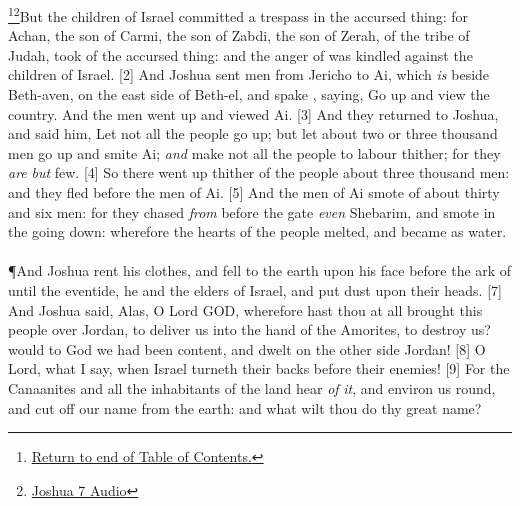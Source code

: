 \footnote{\textcolor[rgb]{0.00,0.25,0.00}{\hyperlink{TOC}{Return to end of Table of Contents.}}}\footnote{\href{https://audiobible.com/bible/joshua_7.html}{\textcolor[cmyk]{0.99998,1,0,0}{Joshua 7 Audio}}}\textcolor[cmyk]{0.99998,1,0,0}{But the children of Israel committed a trespass in the accursed thing: for Achan, the son of Carmi, the son of Zabdi, the son of Zerah, of the tribe of Judah, took of the accursed thing: and the anger of  was kindled against the children of Israel.}
[2] \textcolor[cmyk]{0.99998,1,0,0}{And Joshua sent men from Jericho to Ai, which \emph{is} beside Beth-aven, on the east side of Beth-el, and spake  , saying, Go up and view the country. And the men went up and viewed Ai.}
[3] \textcolor[cmyk]{0.99998,1,0,0}{And they returned to Joshua, and said  him, Let not all the people go up; but let about two or three thousand men go up and smite Ai; \emph{and} make not all the people to labour thither; for they \emph{are} \emph{but} few.}
[4] \textcolor[cmyk]{0.99998,1,0,0}{So there went up thither of the people about three thousand men: and they fled before the men of Ai.}
[5] \textcolor[cmyk]{0.99998,1,0,0}{And the men of Ai smote of  about thirty and six men: for they chased  \emph{from} before the gate \emph{even}  Shebarim, and smote  in the going down: wherefore the hearts of the people melted, and became as water.}\\
\\
\P \textcolor[cmyk]{0.99998,1,0,0}{And Joshua rent his clothes, and fell to the earth upon his face before the ark of  until the eventide, he and the elders of Israel, and put dust upon their heads.}
[7] \textcolor[cmyk]{0.99998,1,0,0}{And Joshua said, Alas, O Lord GOD, wherefore hast thou at all brought this people over Jordan, to deliver us into the hand of the Amorites, to destroy us? would to God we had been content, and dwelt on the other side Jordan!}
[8] \textcolor[cmyk]{0.99998,1,0,0}{O Lord, what  I say, when Israel turneth their backs before their enemies!}
[9] \textcolor[cmyk]{0.99998,1,0,0}{For the Canaanites and all the inhabitants of the land  hear \emph{of} \emph{it}, and  environ us round, and cut off our name from the earth: and what wilt thou do  thy great name?}\\
